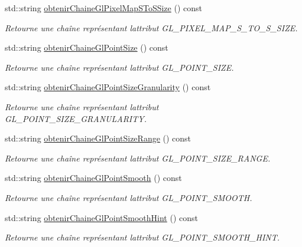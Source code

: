 \begin{DoxyCompactItemize}
std\+::string \hyperlink{group__utilitaire_ga5d77ae2d820ab8304af841033ee957ef}{obtenir\+Chaine\+Gl\+Pixel\+Map\+S\+To\+S\+Size} () const 
\begin{DoxyCompactList}\small\item\em Retourne une chaîne représentant l\textquotesingle{}attribut G\+L\+\_\+\+P\+I\+X\+E\+L\+\_\+\+M\+A\+P\+\_\+\+S\+\_\+\+T\+O\+\_\+\+S\+\_\+\+S\+I\+Z\+E. \end{DoxyCompactList}\item 
std\+::string \hyperlink{group__utilitaire_gad02efc6cfc989e454b9cc91443fef303}{obtenir\+Chaine\+Gl\+Point\+Size} () const 
\begin{DoxyCompactList}\small\item\em Retourne une chaîne représentant l\textquotesingle{}attribut G\+L\+\_\+\+P\+O\+I\+N\+T\+\_\+\+S\+I\+Z\+E. \end{DoxyCompactList}\item 
std\+::string \hyperlink{group__utilitaire_ga77ea6a1da567197d644dcd11743f67a8}{obtenir\+Chaine\+Gl\+Point\+Size\+Granularity} () const 
\begin{DoxyCompactList}\small\item\em Retourne une chaîne représentant l\textquotesingle{}attribut G\+L\+\_\+\+P\+O\+I\+N\+T\+\_\+\+S\+I\+Z\+E\+\_\+\+G\+R\+A\+N\+U\+L\+A\+R\+I\+T\+Y. \end{DoxyCompactList}\item 
std\+::string \hyperlink{group__utilitaire_gab2553c47e6d7fa315b61ab5dcdb1506e}{obtenir\+Chaine\+Gl\+Point\+Size\+Range} () const 
\begin{DoxyCompactList}\small\item\em Retourne une chaîne représentant l\textquotesingle{}attribut G\+L\+\_\+\+P\+O\+I\+N\+T\+\_\+\+S\+I\+Z\+E\+\_\+\+R\+A\+N\+G\+E. \end{DoxyCompactList}\item 
std\+::string \hyperlink{group__utilitaire_ga32e178d5d54d00dc20f27cf516943a65}{obtenir\+Chaine\+Gl\+Point\+Smooth} () const 
\begin{DoxyCompactList}\small\item\em Retourne une chaîne représentant l\textquotesingle{}attribut G\+L\+\_\+\+P\+O\+I\+N\+T\+\_\+\+S\+M\+O\+O\+T\+H. \end{DoxyCompactList}\item 
std\+::string \hyperlink{group__utilitaire_gaa9c02409795d34b851b6da29f7f91c35}{obtenir\+Chaine\+Gl\+Point\+Smooth\+Hint} () const 
\begin{DoxyCompactList}\small\item\em Retourne une chaîne représentant l\textquotesingle{}attribut G\+L\+\_\+\+P\+O\+I\+N\+T\+\_\+\+S\+M\+O\+O\+T\+H\+\_\+\+H\+I\+N\+T. \end{DoxyCompactList}\item 

\end{DoxyCompactItemize}
